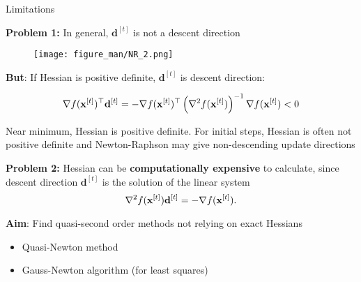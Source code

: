 \documentclass[11pt,compress,t,notes=noshow, xcolor=table]{beamer}
\begin{document}
\begin{vbframe}{Limitations}

\textbf{Problem 1:} In general, $\mathbf{d}^{[t]}$ is not a descent direction

\vspace*{-0.75\baselineskip}

\begin{figure}
    \centering
    \texttt{[image: figure\_man/NR\_2.png]}
\end{figure}

\begin{footnotesize}
\textbf{But}: If Hessian is positive definite, $\mathbf{d}^{[t]}$ is descent direction:

\begin{equation*}
    \nabla f(\mathbf{x}^{[t]})^\top \mathbf{d}^{[t]} = - \nabla f(\mathbf{x}^{[t]})^\top \left(\nabla^2 f(\mathbf{x}^{[t]})\right)^{-1} \nabla f(\mathbf{x}^{[t]}) < 0
\end{equation*}

Near minimum, Hessian is positive definite.
For initial steps, Hessian is often not positive definite and Newton-Raphson may give non-descending update directions
\end{footnotesize}

\framebreak

\textbf{Problem 2:} Hessian can be \textbf{computationally expensive} to calculate, since descent direction $\mathbf{d}^{[t]}$ is the solution of the linear system
\begin{equation*}
    \nabla^2 f(\mathbf{x}^{[t]}) \mathbf{d}^{[t]} = - \nabla f(\mathbf{x}^{[t]}).
\end{equation*}


\lz

\textbf{Aim}: Find quasi-second order methods not relying on exact Hessians
\begin{itemize}
    \item Quasi-Newton method
    \item Gauss-Newton algorithm (for least squares)
\end{itemize}

\end{vbframe}
\end{document}
